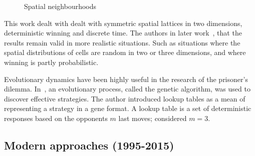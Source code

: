 \documentclass{article}
\begin{document}
\begin{figure}[!hbtp]
\centering
    \begin{subfigure}{.25\textwidth}
        \hspace{.8cm}
            
    \end{subfigure}
    \begin{subfigure}{.25\textwidth}\centering
         
     \end{subfigure}
     \begin{subfigure}{.25\textwidth}\centering
         
     \end{subfigure}
    \begin{subfigure}{.25\textwidth}
            
    \end{subfigure}
    \begin{subfigure}{.25\textwidth}\centering
         
     \end{subfigure}
     \begin{subfigure}{.25\textwidth}\centering
         
     \end{subfigure}
     \caption{Spatial neighbourhoods}\label{fig:topologies}
    \end{figure}

This work dealt with dealt with symmetric spatial lattices in two dimensions,
deterministic winning and discrete time. The authors in later work~\cite{nowak1994spatial},
that the results remain valid in more realistic situations. Such as situations
where the spatial distributions of cells are random in two or three dimensions,
and where winning is partly probabilistic.

Evolutionary dynamics have been highly useful in the research of the prisoner's
dilemma. In~\cite{Axelrod1987}, an evolutionary process, called the genetic
algorithm, was used to discover effective strategies. The author introduced
lookup tables as a mean of representing a strategy in a gene format. A lookup
table is a set of deterministic responses based on the opponents \(m\) last
moves; \cite{Axelrod1987} considered \(m=3\).

\subsection{Modern approaches (1995-2015)}\label{section:modern_approaches}
\end{document}
